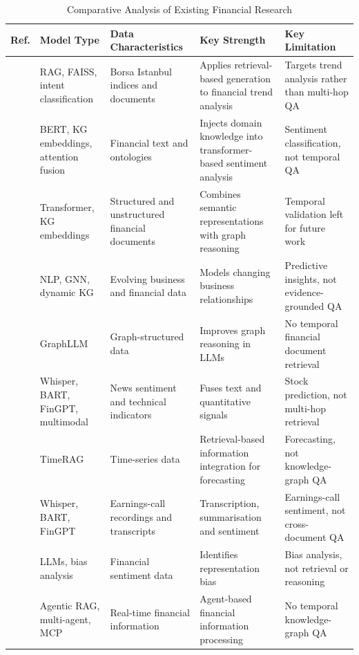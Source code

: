 \documentclass[conference]{IEEEtran}
\begin{document}
\begin{table}[t]
\caption{Comparative Analysis of Existing Financial Research}
\label{tab:lit}
\centering
\footnotesize
\begin{tabular}{p{0.6cm}p{3.0cm}p{3.4cm}p{4.4cm}p{4.6cm}}
\toprule
\textbf{Ref.} & \textbf{Model Type} & \textbf{Data Characteristics} & \textbf{Key Strength} & \textbf{Key Limitation}\\
\midrule
\cite{ertugrul2026rag} & RAG, FAISS, intent classification & Borsa Istanbul indices and documents & Applies retrieval-based generation to financial trend analysis & Targets trend analysis rather than multi-hop QA\\
\cite{yahathugoda2026kgatfin} & BERT, KG embeddings, attention fusion & Financial text and ontologies & Injects domain knowledge into transformer-based sentiment analysis & Sentiment classification, not temporal QA\\
\cite{yarlagadda2026kg} & Transformer, KG embeddings & Structured and unstructured financial documents & Combines semantic representations with graph reasoning & Temporal validation left for future work\\
\cite{jain2025dynamic} & NLP, GNN, dynamic KG & Evolving business and financial data & Models changing business relationships & Predictive insights, not evidence-grounded QA\\
\cite{chai2026graphllm} & GraphLLM & Graph-structured data & Improves graph reasoning in LLMs & No temporal financial document retrieval\\
\cite{van2026llmstock} & Whisper, BART, FinGPT, multimodal & News sentiment and technical indicators & Fuses text and quantitative signals & Stock prediction, not multi-hop retrieval\\
\cite{yang2025timerag} & TimeRAG & Time-series data & Retrieval-based information integration for forecasting & Forecasting, not knowledge-graph QA\\
\cite{icocics2025earnings} & Whisper, BART, FinGPT & Earnings-call recordings and transcripts & Transcription, summarisation and sentiment & Earnings-call sentiment, not cross-document QA\\
\cite{sabuncuoglu2025bias} & LLMs, bias analysis & Financial sentiment data & Identifies representation bias & Bias analysis, not retrieval or reasoning\\
\cite{kamlakshya2025agentic} & Agentic RAG, multi-agent, MCP & Real-time financial information & Agent-based financial information processing & No temporal knowledge-graph QA\\
\bottomrule
\end{tabular}
\end{table}
\end{document}
